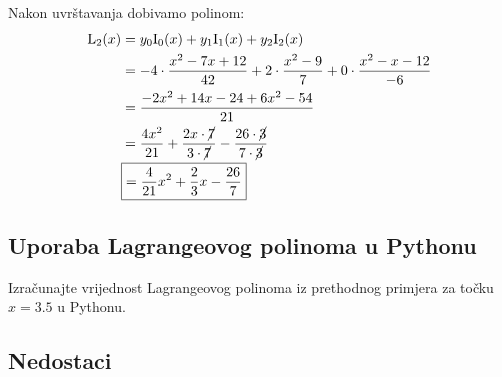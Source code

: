 \begin{multicols}{2}

\vspace*{0pt}

Nakon uvrštavanja dobivamo polinom:
\begin{align*}
\mathrm{L}_2(x) &= y_0\mathrm{I}_0(x) + y_1\mathrm{I}_1(x) + y_2\mathrm{I}_2(x)\\
&= -4\cdot\frac{x^2-7x+12}{42} + 2\cdot\frac{x^2-9}{7} + 0\cdot\frac{x^2-x-12}{-6}\\
&= \frac{-2x^2+14x-24+6x^2-54}{21}\\
&= \frac{4x^2}{21} + \frac{2x\cdot\cancel{7}}{3\cdot\cancel{7}} - \frac{26\cdot\cancel{3}}{7\cdot\cancel{3}}\\
&\boxed{= {\frac{4}{21}}x^2 + {\frac{2}{3}}x - {\frac{26}{7}}}
\end{align*}

\vspace*{0pt}

\newcolumn

\vspace*{0pt}


\end{multicols}

\subsection{Uporaba Lagrangeovog polinoma u Pythonu}

\begin{example}
    Izračunajte vrijednost Lagrangeovog polinoma iz prethodnog primjera za točku
    $x=3.5$ u Pythonu.
\end{example}



\newpage

\subsection{Nedostaci}

